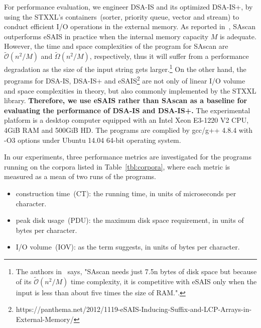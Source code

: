 \documentclass[10pt,journal,compsoc]{IEEEtran}
\begin{document}
For performance evaluation, we engineer DSA-IS and its optimized DSA-IS+, by using the STXXL's containers~(sorter, priority queue, vector and stream) to conduct efficient I/O operations in the external memory. As reported in~\cite{Karkkainen2014}, SAscan outperforms eSAIS in practice when the internal memory capacity $M$ is adequate. However, the time and space complexities of the program for SAscan are $\widetilde{\mathcal{O}}(n^2/ M)$ and $\widetilde{\Omega}(n^2/ M)$, respectively, thus it will suffer from a performance degradation as the size of the input string gets larger.\footnote{The authors in~\cite{Karkkainen2015} says, "SAscan needs just 7.5n bytes of disk space but because of its $\widetilde{\mathcal{O}}(n^2/ M)$ time complexity, it is competitive with eSAIS only when the input is less than about five times the size of RAM.".} On the other hand, the programs for DSA-IS, DSA-IS+ and eSAIS\footnote{https://panthema.net/2012/1119-eSAIS-Inducing-Suffix-and-LCP-Arrays-in-External-Memory/} are not only of linear I/O volume and space complexities in theory, but also commonly implemented by the STXXL library. \textbf{Therefore, we use eSAIS rather than SAscan as a baseline for evaluating the performance of DSA-IS and DSA-IS+.} The experimental platform is a desktop computer equipped with an Intel Xeon E3-1220 V2 CPU, 4GiB RAM and 500GiB HD. The programs are complied by gcc/g++ 4.8.4 with -O3 options under Ubuntu 14.04 64-bit operating system.

In our experiments, three performance metrics are investigated for the programs running on the corpora listed in Table~\ref{tbl:corpora}, where each metric is measured as a mean of two runs of the programs.

\begin{itemize}
	\item construction time~(CT): the running time, in units of microseconds per character.
	\item peak disk usage~(PDU): the maximum disk space requirement, in units of bytes per character.
	\item I/O volume~(IOV): as the term suggests, in units of bytes per character.
\end{itemize}
\end{document}
